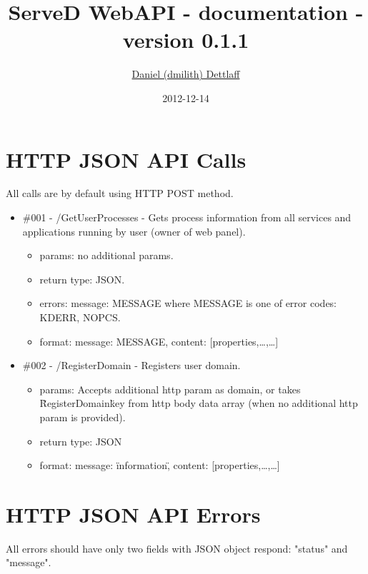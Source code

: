 \documentclass[11pt,a4paper]{report}
\title{ServeD WebAPI - documentation - version 0.1.1}
\author{\href{mailto:dmilith@verknowsys.com}{Daniel (dmilith) Dettlaff}}
\date{2012-12-14}
\begin{document}
\maketitle


\section{HTTP JSON API Calls}\label{sec:apicalls}
  All calls are by default using HTTP POST method.

  \begin{itemize}

    \item \#001 - /GetUserProcesses - Gets process information from all services and applications running by user (owner of web panel).
      \begin{itemize}
        \item params: no additional params.
        \item return type: JSON.
        \item errors: {message: MESSAGE} where MESSAGE is one of error codes: KDERR, NOPCS.
        \item format: {message: MESSAGE, content: [{properties,…},…]}
      \end{itemize}

    \item \#002 - /RegisterDomain - Registers user domain.
      \begin{itemize}
        \item params: Accepts additional http param as domain, or takes \"RegisterDomain\" key from http body data array (when no additional http param is provided).
        \item return type: JSON
        \item format: {message: \"information\", content: [{properties,…},…]}
      \end{itemize}

  \end{itemize}


\section{HTTP JSON API Errors}\label{sec:apierrors}
  All errors should have only two fields with JSON object respond: "status" and "message".
\end{document}
